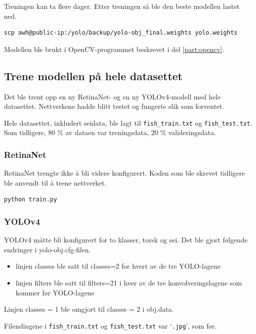 Treningen kan ta flere dager. Etter treningen så ble den beste modellen lastet ned.

\begin{verbatim}
scp awh@public-ip:/yolo/backup/yolo-obj_final.weights yolo.weights
\end{verbatim}

Modellen ble brukt i OpenCV-programmet beskrevet i del \ref{part:opencv}. 

\subsection{Trene modellen på hele datasettet}

Det ble trent opp en ny RetinaNet- og en ny YOLOv4-modell med hele datasettet. Nettverkene hadde blitt testet og fungerte slik som forventet.

Hele datasettet, inkludert seidata, ble lagt til \texttt{fish\_train.txt} og \texttt{fish\_test.txt}. Som tidligere, 80 \% av dataen var treningsdata, 20 \% valideringsdata.

\subsubsection{RetinaNet}

RetinaNet trengte ikke å bli videre konfigurert. Koden som ble skrevet tidligere ble anvendt til å trene nettverket.

\begin{verbatim}
python train.py
\end{verbatim}

\subsubsection{YOLOv4}

YOLOv4 måtte bli konfigurert for to klasser, torsk og sei. Det ble gjort følgende endringer i yolo-obj.cfg-filen.

\begin{itemize}
  \item linjen classes ble satt til classes=2 for hvert av de tre YOLO-lagene
  \item linjen filters ble satt til filters=21 i hver av de tre konvolveringslagene som kommer før YOLO-lagene
\end{itemize}

Linjen classes = 1 ble omgjort til classes = 2 i obj.data. 

Filendingene i \texttt{fish\_train.txt} og \texttt{fish\_test.txt} var `\texttt{.jpg}', som før.

